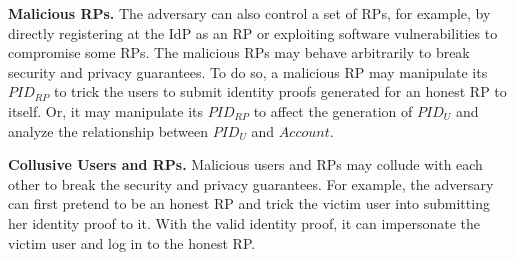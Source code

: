 
\vspace{0.5mm}
\noindent \textbf{Malicious RPs.}
The adversary can also control a set of RPs, for example, by directly registering at the IdP as an RP or exploiting software vulnerabilities to compromise some RPs.
The malicious RPs may behave arbitrarily to break security and privacy guarantees.
To do so, %
a malicious RP may manipulate its $PID_{RP}$ to trick the users to submit identity proofs generated for an honest RP to itself. %
Or, it may manipulate its $PID_{RP}$ to affect the generation of $PID_U$ and analyze the relationship between $PID_U$ and $Account$.

\vspace{0.5mm}
\noindent \textbf{Collusive Users and RPs.} %
Malicious users and RPs may collude with each other %
to break the security and privacy guarantees.
For example, the adversary can first pretend to be an honest RP and trick the victim user into submitting her identity proof to it. With the valid identity proof, it can impersonate the victim user and log in to the honest RP.



